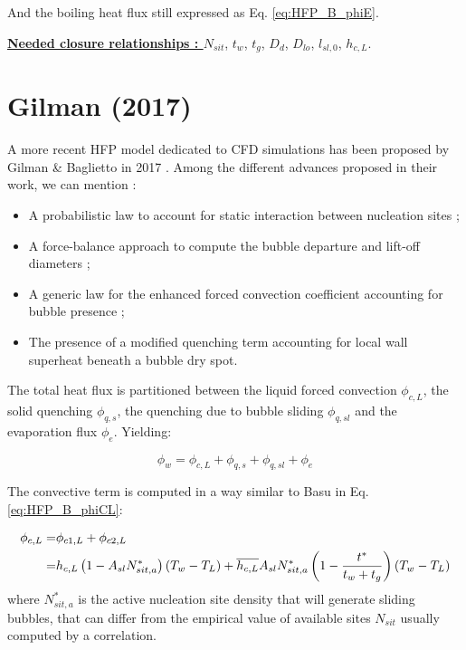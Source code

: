 And the boiling heat flux still expressed as Eq. \ref{eq:HFP_B_phiE}.

\npar


\textbf{\underline{Needed closure relationships : }} $N_{sit}$, $t_{w}$, $t_{g}$, $D_{d}$, $D_{lo}$, $l_{sl,0}$, $h_{c,L}$. 



\section{Gilman (2017)}

A more recent HFP model dedicated to CFD simulations has been proposed by Gilman \& Baglietto in 2017 \cite{gilman2017}. Among the different advances proposed in their work, we can mention :

\begin{itemize}
\item A probabilistic law to account for static interaction between nucleation sites ;
\item A force-balance approach to compute the bubble departure and lift-off diameters ;
\item A generic law for the enhanced forced convection coefficient accounting for bubble presence ; 
\item The presence of a modified quenching term accounting for local wall superheat beneath a bubble dry spot.
\end{itemize}

The total heat flux is partitioned between the liquid forced convection $\phi_{c,L}$, the solid quenching $\phi_{q,s}$, the quenching due to bubble sliding $\phi_{q,sl}$ and the evaporation flux $\phi_{e}$. Yielding:

\begin{equation}
\phi_{w} = \phi_{c,L} + \phi_{q,s} + \phi_{q,sl} + \phi_{e}
\end{equation} 

The convective term is computed in a way similar to Basu \etal \cite{Basu2005} in Eq. \ref{eq:HFP_B_phiCL}:

\begin{align}
\phi_{c,L} =& \phi_{c1,L} + \phi_{c2,L}\\
% 
=&h_{c,L}\parth{1-A_{sl}N_{sit,a}^{*}}\parth{T_{w}-T_{L}} + \overline{h_{c,L}}A_{sl}N_{sit,a}^{*}\parth{1 - \frac{t^{*}}{t_{w}+t_{g}}}\parth{T_{w}-T_{L}}
\end{align}
where $N_{sit,a}^{*}$ is the active nucleation site density that will generate sliding bubbles, that can differ from the empirical value of available sites $N_{sit}$ usually computed by a correlation. 

